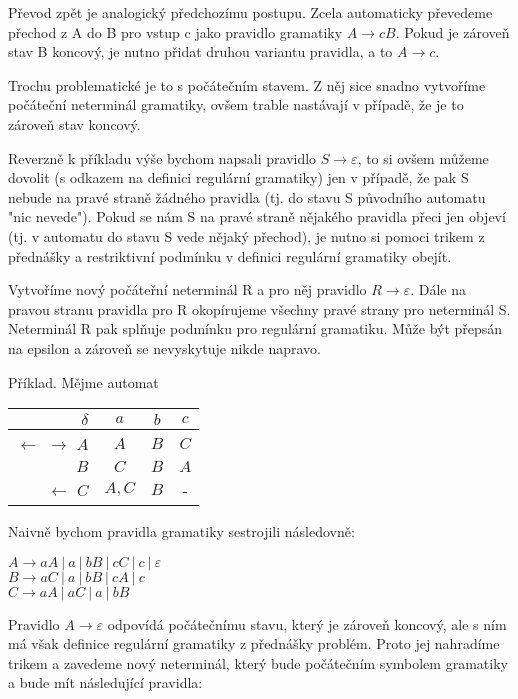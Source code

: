 \documentclass{article}
\begin{document}
Převod zpět je analogický předchozímu postupu.
Zcela automaticky převedeme přechod z A do B pro vstup c jako pravidlo gramatiky $A \rightarrow cB$.
Pokud je zároveň stav B koncový, je nutno přidat druhou variantu pravidla, a to $A \rightarrow c$.

Trochu problematické je to s počátečním stavem. 
Z něj sice snadno vytvoříme počáteční neterminál gramatiky, ovšem trable nastávají v případě, že je to zároveň stav koncový.

Reverzně k příkladu výše bychom napsali pravidlo $S \rightarrow \varepsilon$, to si ovšem můžeme dovolit (s odkazem na definici regulární gramatiky) jen v případě, 
že pak S nebude na pravé straně žádného pravidla (tj. do stavu S původního automatu "nic nevede").
Pokud se nám S na pravé straně nějakého pravidla přeci jen objeví (tj. v automatu do stavu S vede nějaký přechod), je nutno si pomoci trikem z přednášky a 
restriktivní podmínku v definici regulární gramatiky obejít.

Vytvoříme nový počáteřní neterminál R a pro něj pravidlo $R \rightarrow \varepsilon$. Dále na pravou stranu pravidla pro R okopírujeme všechny pravé strany pro neterminál S.
Neterminál R pak splňuje podmínku pro regulární gramatiku. 
Může být přepsán na epsilon a zároveň se nevyskytuje nikde napravo.

Příklad. Mějme automat

\noindent
\begin{tabular}{|r||c|c|c|}
\hline
 $\delta$ &      $a$ &   $b$ &   $c$\\
\hline
\hline
$\leftarrow$ $\rightarrow$ $A$ &        $A$ &   $B$ &   $C$\\
$B$ &   $C$ &   $B$ &   $A$\\
$\leftarrow$ $C$ &      $A,C$ & $B$ &   -\\
\hline
\end{tabular}

Naivně bychom pravidla gramatiky sestrojili následovně:

\noindent
$A \rightarrow aA ~ | ~a~ | ~bB~ | ~cC~ | ~c~ | ~\varepsilon$\\
$B \rightarrow aC ~ | ~a~ | ~bB~ | ~cA~ | ~c$\\
$C \rightarrow aA~ | ~aC~ |~a~ | ~ bB $

Pravidlo $A \rightarrow \varepsilon$ odpovídá počátečnímu stavu, který je zároveň koncový, ale s ním má však definice regulární gramatiky z přednášky problém. Proto jej nahradíme trikem a zavedeme nový neterminál, který bude počátečním symbolem gramatiky a bude mít následující pravidla:
\end{document}
